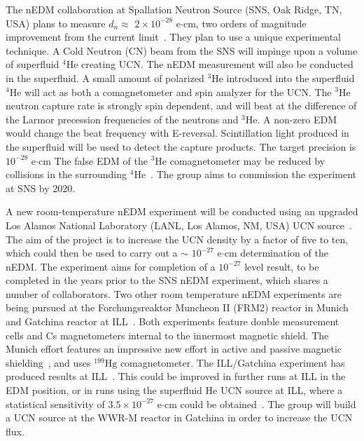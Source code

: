 The nEDM collaboration at Spallation
Neutron Source (SNS, Oak Ridge, TN, USA) plans to measure $d_n\approx$ $2\times10^{-28}$ e$\cdot$cm, two orders
of magnitude improvement from the current limit~\cite{sns_lim}. They plan to use a unique experimental technique. A Cold Neutron (CN) beam from the SNS will impinge upon a volume of superfluid $^4\mathrm{He}$ creating UCN. The nEDM measurement will also be conducted in the superfluid. A small amount of polarized $^3\mathrm{He}$ introduced into the superfluid $^4\mathrm{He}$ will
act as both a comagnetometer and spin analyzer for the UCN. The $^3\mathrm{He}$ neutron capture rate is strongly spin dependent, and will beat at the difference of the Larmor precession frequencies of the neutrons and $^3\mathrm{He}$. A non-zero EDM would change the beat frequency with E-reversal. Scintillation light produced in the superfluid will be used to detect the capture products. The target precision is $10^{-28}$ e$\cdot$cm The false EDM of the $^3\mathrm{He}$ comagnetometer may be reduced by collisions in the surrounding $^4\mathrm{He}$~\cite{sns_false_edm}. The group aims to
commission the experiment at SNS by 2020.

A new room-temperature nEDM experiment will be conducted using an upgraded
Los Alamos National Laboratory (LANL, Los Alamos, NM, USA) UCN source~\cite{lanl_nEDM-workshop}. The aim of the project is to increase the UCN density by a factor of five to ten, which could then be used to carry out a $\sim$ $10^{-27}$ e$\cdot$cm determination
of the nEDM. The experiment aims for completion of a $10^{-27}$ level result, to be completed in the years prior to the SNS nEDM experiment, which shares a number of collaborators. Two other room temperature nEDM experiments are being pursued at the Forchungsreaktor Muncheon II (FRM2) reactor in Munich~\cite{frm2} and Gatchina reactor at ILL~\cite{PNPI}. Both experiments feature double measurement cells and Cs magnetometers internal to the innermost magnetic shield. The Munich effort features an impressive new effort in active and passive magnetic shielding~\cite{msr_design,shield_pnpi,shield_pnpi2}, and uses $^{199}\mathrm{Hg}$ comagnetometer. The ILL/Gatchina experiment has produced results at ILL~\cite{PNPI}. This could be improved in further runs at ILL in the EDM position, or in runs using the superfluid He UCN source at ILL, where a statistical sensitivity of $3.5 \times 10^{-27}$ e$\cdot$cm could be obtained~\cite{pnpi_nEDM-workshop}. The group will build a UCN source at the WWR-M reactor in Gatchina in order to increase the UCN 
flux.

